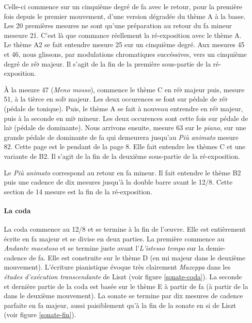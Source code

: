Celle-ci commence sur un cinquième degré de fa avec le retour, pour la première fois depuis le premier mouvement, d'une version dégradée du thème A à la basse. Les 20 premières mesures ne sont qu'une préparation au retour du fa mineur meseure 21. C'est là que commance réellement la ré-exposition avec le thème A. Le thème A2 se fait entendre mesure 25 sur un cinquième degré. Aux mesures 45 et 46, nous glissons, par modulations chromatiques succéssives, vers un cinquième degré de ré$\flat$ majeur. Il s'agit de la fin de la première sous-partie de la ré-exposition.

À la mesure 47 (\emph{Meno mosso}), commence le thème C en ré$\flat$ majeur puis, mesure 51, à la tièrce en sol$\flat$ majeur. Les deux occurences se font sur pédale de ré$\flat$ (pédale de tonique). Puis, le thème A se fait à nouveau entrendre en ré$\flat$ majeur, puis à la seconde en mi$\flat$ mineur. Les deux occurences sont cette fois sur pédale de la$\flat$ (pédale de dominante). Nous arrivons ensuite, mesure 63 sur le \emph{piano}, sur une grande pédale de dominante de fa qui demeurera jusqu'au \emph{Più animato} mesure 82. Cette page est le pendant de la page 8. Elle fait entendre les thèmes C et une variante de B2. Il s'agit de la fin de la deuxième sous-partie de la ré-exposition.

Le \emph{Più animato} correspond au retour en fa mineur. Il fait entendre le thème B2 puis une cadence de dix mesures jusqu'à la double barre avant le 12/8. Cette section de 14 mesure est la fin de la ré-exposition.

\newpage

\paragraph{La coda}

La coda commence au 12/8 et se termine à la fin de l'œuvre. Elle est entièrement écrite en fa majeur et se divise en deux parties. La première commence au \emph{Andante maestoso} et se termine juste avant l'\emph{L'istesso tempo} sur la demie-cadence de fa. Elle est construite sur le thème D (en mi majeur dans le deuxième mouvement). L'écriture pianistique évoque très clairement \emph{Mazeppa} dans les \emph{études d'exécution transcendante} de Liszt (voir figure \ref{sonate-coda}). La seconde et dernière partie de la coda est basée sur le thème E à partir de fa (à partir de la dans le deuxième mouvement). La sonate se termine par dix mesures de cadence parfaite en fa majeur, aussi paisiblement qu'à la fin de la sonate en si de Liszt (voir figure \ref{sonate-fin}).\\

